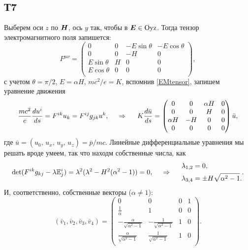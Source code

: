 \subsection*{Т7}

Выберем оси $z$ по $\mbox{\boldmath $H$}$, ось $y$ так, чтобы в $ \mbox{\boldmath $E$} \in \text{Oyz}$.
Тогда тензор электромагнитного поля запишется:
\begin{equation*}
	F^{\mu \nu} = 
	\begin{pmatrix}
	    0 & 0 & -E \sin \theta  & -E \cos \theta \\
	    0 & 0 & -H & 0 \\
	    E \sin \theta & H & 0 & 0 \\
	    E \cos \theta & 0 & 0 & 0 \\
	\end{pmatrix},
\end{equation*}
с учетом $\theta = \pi/2$, $E = \alpha H$, $m c^2 / e = K$, вспомнив \eqref{EMtensor},
запишем уравнение движения
\begin{equation*}
	 \frac{m c^2}{e} \frac{d u^i}{d s} = F^{ik} u_k = F^{ij} g_{jk} u^k,
	 \hspace{0.5cm} \Rightarrow \hspace{0.5cm}
	 K \frac{d \bar{u}}{d s}  = \begin{pmatrix}
	     0 & 0 & \alpha H  & 0 \\
	     0 & 0 & H  & 0 \\
	     \alpha H & -H & 0 & 0 \\
	     0 & 0 & 0 & 0 \\
	 \end{pmatrix} \bar{u},
\end{equation*}
где $\bar{u} = (u_0, \, u_x,\, u_y,\, u_z) = \bar{p} / m c$. 
Линейные дифференциальные уравнения мы решать вроде умеем, так что находм собственные числа, как
\begin{equation*}
	\det (F^{ik} g_{kj} - \lambda \mathbb{E}^i_j) = \lambda^2 (\lambda^2 - H^2 (\alpha^2-1)) = 0,
	\hspace{0.5cm} \Rightarrow \hspace{0.5cm}
	\begin{aligned}
	    \lambda_{1, 2} &= 0, \\
	    \lambda_{3, 4} &= \pm H \sqrt{\alpha^2 - 1}.
	\end{aligned}.
\end{equation*}
И, соответственно, собственные векторы ($\alpha \neq 1$):
\begin{equation*}
	(\bar{v}_1, \bar{v}_2, \bar{v}_3, \bar{v}_4) = 
	\left(
	\begin{array}{cccc}
	 0 & 0 & 0 & 1 \\
	 \frac{1}{\alpha } & 1 & 0 & 0 \\
	 -\frac{\alpha }{\sqrt{\alpha ^2-1}} & -\frac{1}{\sqrt{\alpha ^2-1}} & 1 & 0 \\
	 \frac{\alpha }{\sqrt{\alpha ^2-1}} & \frac{1}{\sqrt{\alpha ^2-1}} & 1 & 0 \\
	\end{array}
	\right).
\end{equation*}
